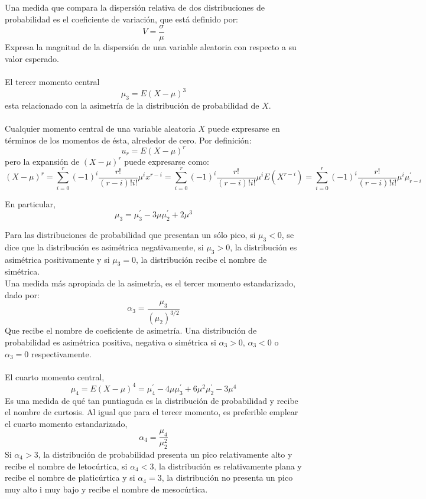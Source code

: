  Una medida que compara la dispersión relativa de dos distribuciones de probabilidad es el coeficiente de variación, que está definido por:
 $$V=\dfrac{\sigma}{\mu}$$
 Expresa la magnitud de la dispersión de una variable aleatoria con respecto a su valor esperado.\\\\

 El tercer momento central
 $$\mu_3 = E(X-\mu)^3$$
 esta relacionado con la asimetría de la distribución de probabilidad de $X$.\\\\

 Cualquier momento central de una variable aleatoria $X$ puede expresarse en términos de los momentos de ésta, alrededor de cero. Por definición:
 $$u_r = E(X-\mu)^r$$
 pero la expansión de $(X-\mu)^r$ puede expresarse como:
 $$(X-\mu)^r = \sum_{i=0}^r (-1)^i \dfrac{r!}{(r-i)!i!}\mu^i x^{r-i} = \sum_{i=0}^r (-1)^i \dfrac{r!}{(r-i)!i!}\mu^i E(X^{r-i}) = \sum_{i=0}^r (-1)^i \dfrac{r!}{(r-i)!i!}\mu^i \mu^{'}_{r-i}$$

 En particular,
 $$\mu_3 = \mu_3^{'} - 3\mu\mu^{'}_2 + 2\mu^3$$

 Para las distribuciones de probabilidad que presentan un sólo pico, si $\mu_3 < 0$, se dice que la distribución es asimétrica negativamente, si $\mu_3 > 0$, la distribución es asimétrica positivamente y si $\mu_3 = 0$, la distribución recibe el nombre de simétrica.\\
 Una medida más apropiada de la asimetría, es el tercer momento estandarizado, dado por:
 $$\alpha_3 = \dfrac{\mu_3}{(\mu_2)^{3/2}}$$ Que recibe el nombre de coeficiente de asimetría. Una distribución de probabilidad es asimétrica positiva, negativa o simétrica si $\alpha_3 > 0$, $\alpha_3<0$ o $\alpha_3=0$ respectivamente.\\\\

 El cuarto momento central, 
 $$\mu_4 = E(X-\mu)^4 = \mu^{'}_4 - 4\mu \mu^{'}_3 + 6\mu^2 \mu^{'}_2 - 3 \mu^4$$
 Es una medida de qué tan puntiaguda es la distribución de probabilidad y recibe el nombre de curtosis. Al igual que para el tercer momento, es preferible emplear el cuarto momento estandarizado,
 $$\alpha_4  = \dfrac{\mu_4}{\mu^2_2}$$
 Si $\alpha_4>3$, la distribución de probabilidad presenta un pico relativamente alto y recibe el nombre de letocúrtica, si $\alpha_4<3$, la distribución es relativamente plana y recibe el nombre de platicúrtica y si $\alpha_4 = 3$, la distribución no presenta un pico muy alto i muy bajo y recibe el nombre de mesocúrtica. \\\\

